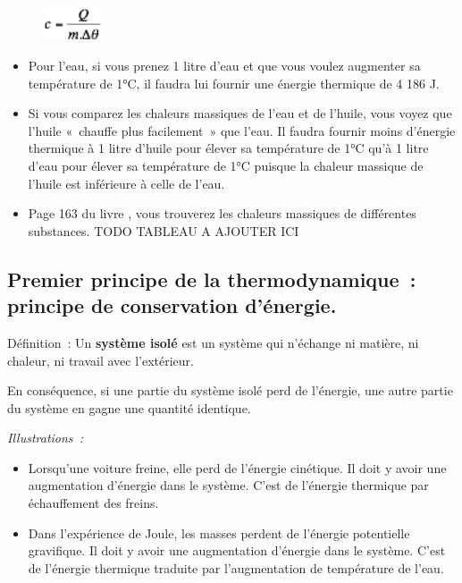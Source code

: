 \begin{figure}
\centering
\includegraphics[width=1.742cm,height=0.989cm]{Pictures/10000001000000310000001C55B97172EC4D3DC9.png}
\caption{}
\end{figure}

\begin{itemize}
\item  Pour l'eau, si vous prenez 1 litre d'eau et que vous voulez augmenter
  sa température de 1°C, il faudra lui fournir une énergie thermique de
  4 186 J.
\item  Si vous comparez les chaleurs massiques de l'eau et de l'huile, vous
  voyez que l'huile «~chauffe plus facilement~» que l'eau. Il faudra
  fournir moins d'énergie thermique à 1 litre d'huile pour élever sa
  température de 1°C qu'à 1 litre d'eau pour élever sa température de
  1°C puisque la chaleur massique de l'huile est inférieure à celle de
  l'eau.
\item   Page 163 du livre , vous trouverez les chaleurs massiques de
  différentes substances.
  TODO TABLEAU A AJOUTER ICI 
\end{itemize}

\subsection{Premier principe de la thermodynamique~: principe de  conservation d'énergie. }

Définition~: Un \textbf{système isolé }est un système qui n'échange ni
matière, ni chaleur, ni travail avec l'extérieur.

En conséquence, si une partie du système isolé perd de l'énergie, une
autre partie du système en gagne une quantité identique.

\emph{Illustrations~: }
\begin{itemize}
\item  Lorsqu'une voiture freine, elle perd de l'énergie cinétique. Il doit y
  avoir une augmentation d'énergie dans le système. C'est de l'énergie
  thermique par échauffement des freins.
\item  Dans l'expérience de Joule, les masses perdent de l'énergie
  potentielle gravifique. Il doit y avoir une augmentation d'énergie
  dans le système. C'est de l'énergie thermique traduite par
  l'augmentation de température de l'eau.
\end{itemize}


